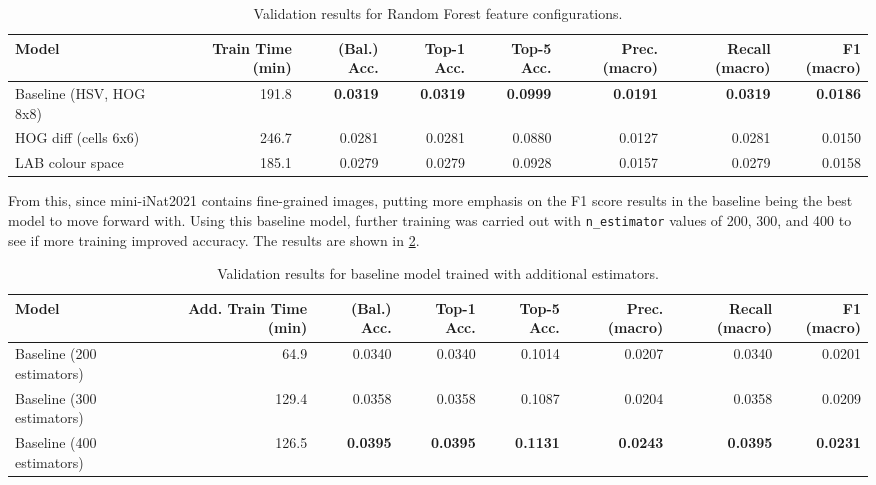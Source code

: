 \begin{table}[t]
  \centering
  \small
  \caption{Validation results for Random Forest feature configurations.}
  \label{tab:rf-feature-comparison}
  \begin{tabular}{@{}lrrrrrrr@{}}
    \toprule
    Model                   & Train Time (min) & (Bal.) Acc.     & Top-1 Acc.      & Top-5 Acc.      & Prec. (macro)   & Recall (macro)  & F1 (macro)      \\
    \midrule
    Baseline (HSV, HOG 8x8) & 191.8            & \textbf{0.0319} & \textbf{0.0319} & \textbf{0.0999} & \textbf{0.0191} & \textbf{0.0319} & \textbf{0.0186} \\
    HOG diff (cells 6x6)    & 246.7            & 0.0281          & 0.0281          & 0.0880          & 0.0127          & 0.0281          & 0.0150          \\
    LAB colour space        & 185.1            & 0.0279          & 0.0279          & 0.0928          & 0.0157          & 0.0279          & 0.0158          \\
    \bottomrule
  \end{tabular}
\end{table}

From this, since mini-iNat2021 contains fine-grained images, putting more emphasis on the F1 score results in the baseline being the best model to move forward with. Using this baseline model, further training was
carried out with \texttt{n\_estimator} values of 200, 300, and 400 to see if more training improved accuracy. The results are shown in \cref{tab:rf-longer-training}.

\begin{table}[t]
  \centering
  \small
  \caption{Validation results for baseline model trained with additional estimators.}
  \label{tab:rf-longer-training}
  \begin{tabular}{@{}lrrrrrrr@{}}
    \toprule
    Model                     & Add. Train Time (min) & (Bal.) Acc.     & Top-1 Acc.      & Top-5 Acc.      & Prec. (macro)   & Recall (macro)  & F1 (macro)      \\
    \midrule
    Baseline (200 estimators) & 64.9                  & 0.0340          & 0.0340          & 0.1014          & 0.0207          & 0.0340          & 0.0201          \\
    Baseline (300 estimators) & 129.4                 & 0.0358          & 0.0358          & 0.1087          & 0.0204          & 0.0358          & 0.0209          \\
    Baseline (400 estimators) & 126.5                 & \textbf{0.0395} & \textbf{0.0395} & \textbf{0.1131} & \textbf{0.0243} & \textbf{0.0395} & \textbf{0.0231} \\
    \bottomrule
  \end{tabular}
\end{table}


